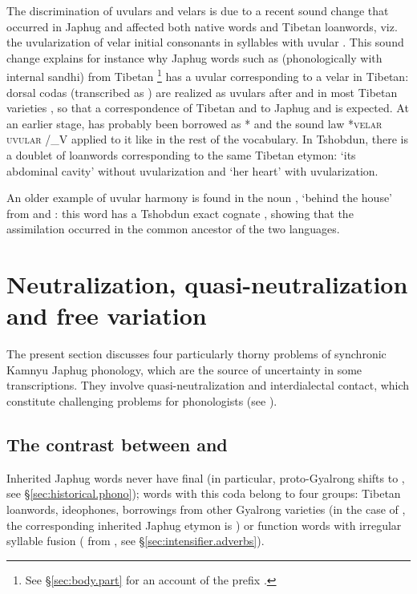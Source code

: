 The discrimination of uvulars and velars is due to a recent sound change that occurred in Japhug and affected both native words and Tibetan loanwords, viz. the uvularization of velar initial consonants in syllables with uvular . This sound change explains for instance why Japhug words such as  (phonologically  with internal sandhi) from Tibetan \footnote{See §\ref{sec:body.part} for an account of the prefix .} has a uvular  corresponding to a velar  in Tibetan: dorsal codas (transcribed as ) are realized as uvulars after  and  in most Tibetan varieties \citep{gong16amdo}, so that a correspondence of Tibetan  and  to Japhug  and  is expected. At an earlier stage,  has probably been borrowed as * and the sound law *\textsc{velar} \fl{} \textsc{uvular} /\_V applied to it like in the rest of the vocabulary. In Tshobdun, there is a doublet of loanwords corresponding to the same Tibetan etymon:    `its abdominal cavity' \citep[413]{jackson19tshobdun} without uvularization and  `her heart' \citep[704]{jackson19tshobdun} with uvularization.

An older example of uvular harmony is found in the noun , `behind the house' from  and : this word has a Tshobdun exact cognate  \citep[172]{jackson19tshobdun}, showing that the assimilation occurred in the common ancestor of the two languages.

\section{Neutralization, quasi-neutralization and free variation}
The present section discusses four particularly thorny problems of synchronic Kamnyu Japhug phonology, which are the source of uncertainty in some transcriptions. They involve quasi-neutralization and interdialectal contact, which constitute challenging problems for phonologists (see \citealt{michaud06neutralisation}). 

\subsection{The contrast between  and } \label{sec:aN.oN.free}
Inherited Japhug words never have final  (in particular, proto-Gyalrong  shifts to , see §\ref{sec:historical.phono}); words with this coda belong to four groups: Tibetan loanwords, ideophones, borrowings from other Gyalrong varieties (in the case of , the corresponding inherited Japhug etymon is ) or function words with irregular syllable fusion ( from , see §\ref{sec:intensifier.adverbs}).

